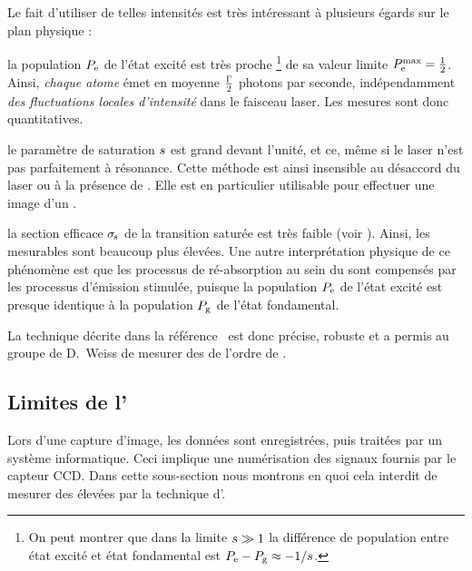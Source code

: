 \noindent
Le fait d'utiliser de telles intensités est très intéressant à plusieurs égards sur le plan physique :
\begin{ditemize}
	\item la population ${P_{\rm e}}$ de l'état excité est très proche%
	\footnote{On peut montrer que dans la limite ${s}\gg1$ la différence de population entre état excité et état fondamental est ${P_{\rm e}} - {P_{\rm g}} \approx-{{1} / {{s}}}$.} 
	de sa valeur limite ${P_{\rm e}^{\rm max}}=\tfrac{1}{2}$. Ainsi, \emph{chaque atome} émet en moyenne $\tfrac{{\Gamma}}{2}$ photons par seconde, indépendamment \emph{des fluctuations locales d'intensité} dans le faisceau laser. Les mesures sont donc quantitatives.
	\item le paramètre de saturation ${s}$ est grand devant l'unité, et ce, même si le laser n'est pas parfaitement à résonance. Cette méthode est ainsi insensible au désaccord du laser ou à la présence de \gchm. Elle est en particulier utilisable pour effectuer une image d'un \pmo.
	\item la section efficace ${\sigma_{\hspace{-1pt}{{s}}}}$ de la transition saturée est très faible (voir ). Ainsi, les \dos mesurables sont beaucoup plus élevées. Une autre interprétation physique de ce phénomène est que les processus de ré-absorption au sein du \n sont compensés par les processus d'émission stimulée, puisque la population ${P_{\rm e}}$ de l'état excité est presque identique à la population ${P_{\rm g}}$ de l'état fondamental.
\end{ditemize}
La technique décrite dans la référence~\cite{DLH00} est donc précise, robuste et a permis au groupe de D.~Weiss de mesurer des \do de l'ordre de .


\subsection{Limites de l'\ipafas}\label{sec:LimiteIpafas}
Lors d'une capture d'image, les données sont enregistrées, puis traitées par un système informatique. Ceci implique une numérisation des signaux fournis par le capteur CCD. 
Dans cette sous-section nous montrons en quoi cela interdit de mesurer des \dos élevées par la technique d'\ipafas. 



